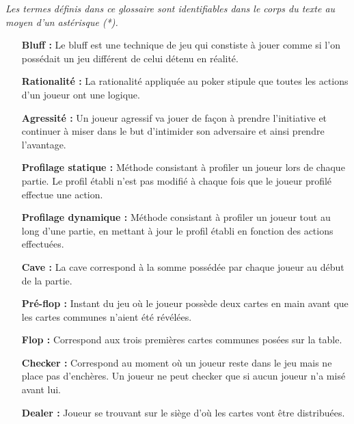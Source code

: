 \documentclass{report}
\begin{document}
	\textit{Les termes définis dans ce glossaire sont identifiables dans le corps du texte au moyen d'un astérisque (*).}
	\bigbreak
	\begin{itemize}
	
	
		
		\item[\textbf{Bluff : }]Le bluff est une technique de jeu qui constiste à jouer comme si l'on possédait un jeu différent de celui détenu en réalité.\medskip
		
		\item[\textbf{Rationalité : }]La rationalité  appliquée au poker stipule que toutes les actions d'un joueur ont une logique.\medskip

		\item[\textbf{Agressité : }]	Un joueur agressif va jouer de façon à prendre l'initiative et continuer à miser dans le but d'intimider son adversaire et ainsi prendre l'avantage.	\medskip
		
		\item[\textbf{Profilage statique : }]Méthode consistant à profiler un joueur lors de chaque partie. Le profil établi n'est pas modifié à chaque fois que le joueur profilé effectue une action.\medskip
		
		\item[\textbf{Profilage dynamique : }]Méthode consistant à profiler un joueur tout au long d'une partie, en mettant à jour le profil établi en fonction des actions effectuées.\medskip
		
		\item[\textbf{Cave : }]La cave correspond à la somme possédée par chaque joueur au début de la partie.\medskip
		
		\item[\textbf{Pré-flop : }]Instant du jeu où le joueur possède deux cartes en main avant que les cartes communes n'aient été révélées.\medskip
		
		\item[\textbf{Flop : }]Correspond aux trois premières cartes communes posées sur la table.\medskip
		
		\item[\textbf{Checker : }]Correspond au moment où un joueur reste dans le jeu mais ne place pas d'enchères. Un joueur ne peut checker que si aucun joueur n'a misé avant lui.\medskip
		
		\item[\textbf{Dealer : }]Joueur se trouvant sur le siège d'où les cartes vont être distribuées.\medskip
		

\end{itemize}
\end{document}
